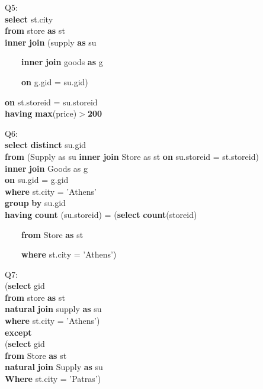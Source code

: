 \documentclass[a4paper]{article}
\begin{document}
\begin{minipage}{\linewidth}
Q5: \\

\textbf{select} st.city\\

\textbf{from} store \textbf{as} st\\
\textbf{inner} \textbf{join} (supply \textbf{as} su

    ~~~~\textbf{inner} \textbf{join} goods \textbf{as} g
    
    ~~~~\textbf{on} g.gid = su.gid)
    
\textbf{on} st.storeid = su.storeid\\

\textbf{having} \textbf{max}(price)$>$\textbf{200}\\

\end{minipage}

\begin{minipage}{\linewidth}
Q6: \\

\textbf{select} \textbf{distinct} su.gid \\

\textbf{from} (Supply as su \textbf{inner} \textbf{join} Store as st \textbf{on} su.storeid = st.storeid) \\
\textbf{inner} \textbf{join} Goods as g \\
\textbf{on} su.gid = g.gid \\

\textbf{where} st.city = 'Athens' \\
\textbf{group} \textbf{by} su.gid \\
\textbf{having} \textbf{count} (su.storeid) = (\textbf{select} \textbf{count}(storeid) 

~~~~\textbf{from} Store \textbf{as} st

~~~~\textbf{where} st.city = 'Athens')\\

\end{minipage}

\begin{minipage}{\linewidth}
Q7: \\

(\textbf{select} gid\\

\textbf{from} store \textbf{as} st \\
\textbf{natural} \textbf{join} supply \textbf{as} su\\

\textbf{where} st.city = 'Athens')\\

\textbf{except}\\

(\textbf{select} gid\\

\textbf{from} Store \textbf{as} st\\
\textbf{natural} \textbf{join} Supply \textbf{as} su\\

\textbf{Where} st.city = 'Patras')\\

\end{minipage}
\end{document}
